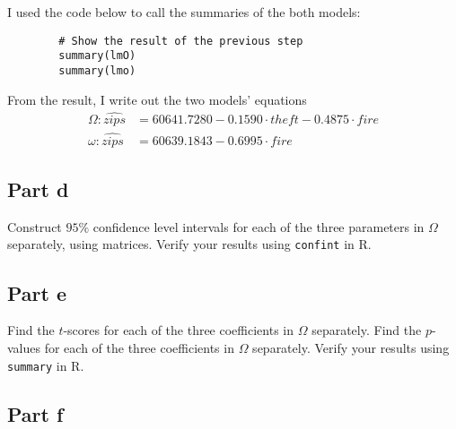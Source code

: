 \begin{answer}
    I used the code below to call the summaries of the both models:
    \begin{verbatim}
        # Show the result of the previous step
        summary(lmO)
        summary(lmo)
    \end{verbatim}
    From the result, I write out the two models' equations
    \begin{equation}
        \begin{aligned}
            \Omega: \widehat{zips} & = 60641.7280 - 0.1590 \cdot theft - 0.4875 \cdot fire\\
            \omega: \widehat{zips} & = 60639.1843 - 0.6995 \cdot fire
        \end{aligned}
    \end{equation}
\end{answer}

\subsection{Part d}

\begin{question}
    Construct $95\%$ confidence level intervals for each of the three parameters in $\Omega$ separately, using matrices. Verify your results using \verb+confint+ in R.
\end{question}

\begin{answer}
    
\end{answer}

\subsection{Part e}

\begin{question}
    Find the $t$-scores for each of the three coefficients in $\Omega$ separately. Find the $p$-values for each of the three coefficients in $\Omega$ separately. Verify your results using \verb+summary+ in R.
\end{question}

\begin{answer}
    
\end{answer}

\subsection{Part f}

